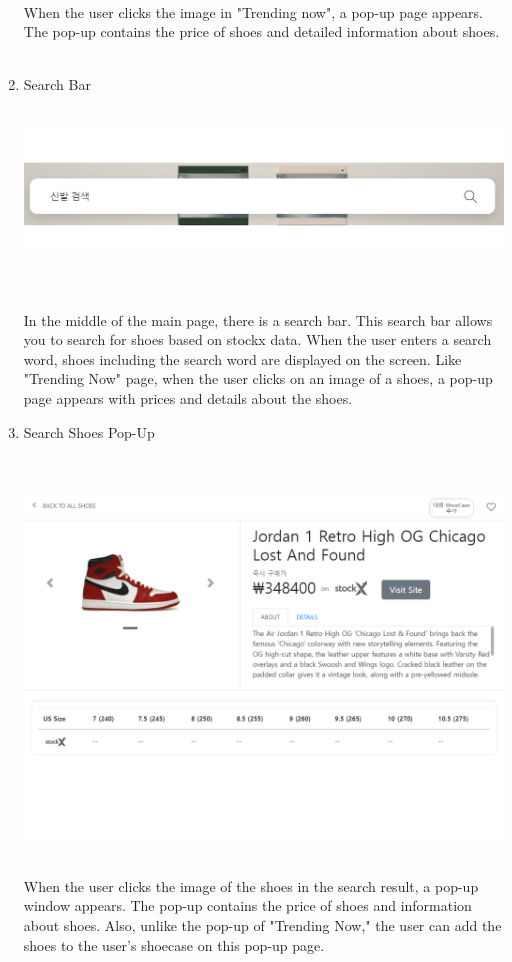 \documentclass[conference]{IEEEtran}
\begin{document}
\begin{enumerate}
\\When the user clicks the image in "Trending now", a pop-up page appears. The pop-up contains the price of shoes and detailed information about shoes.\\\\
	\item Search Bar \\\\
\centerline{\includegraphics[scale=0.35]{pics/searchbar.png}}\\\\
In the middle of the main page, there is a search bar. This search bar allows you to search for shoes based on stockx data. When the user enters a search word, shoes including the search word are displayed on the screen. Like "Trending Now" page, when the user clicks on an image of a shoes, a pop-up page appears with prices and details about the shoes.\\
	\item Search Shoes Pop-Up\\\\
\\\centerline{\includegraphics[scale=0.35]{pics/search_detail.png}}
\\When the user clicks the image of the shoes in the search result, a pop-up window appears. The pop-up contains the price of shoes and information about shoes. Also, unlike the pop-up of "Trending Now," the user can add the shoes to the user's shoecase on this pop-up page. \\

\end{enumerate}
\end{document}
